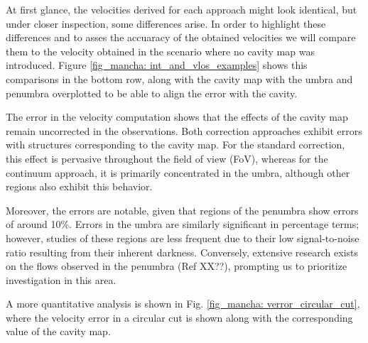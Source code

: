 At first glance, the velocities derived for each approach might look identical, but under closer inspection, some differences arise. In order to highlight these differences and to asses the accuaracy of the obtained velocities we will compare them to the velocity obtained in the scenario where no cavity map was introduced. Figure \ref{fig_mancha: int_and_vlos_examples} shows this comparisons in the bottom row, along with the cavity map with the umbra and penumbra overplotted to be able to align the error with the cavity.   

The error in the velocity computation shows that the effects of the cavity map remain uncorrected in the observations. Both correction approaches exhibit errors with structures corresponding to the cavity map. For the standard correction, this effect is pervasive throughout the field of view (FoV), whereas for the continuum approach, it is primarily concentrated in the umbra, although other regions also exhibit this behavior.

Moreover, the errors are notable, given that regions of the penumbra show errors of around 10\%. Errors in the umbra are similarly significant in percentage terms; however, studies of these regions are less frequent due to their low signal-to-noise ratio resulting from their inherent darkness. Conversely, extensive research exists on the flows observed in the penumbra (Ref XX??), prompting us to prioritize investigation in this area.

A more quantitative analysis is shown in Fig. \ref{fig_mancha: verror_circular_cut}, where the velocity error in a circular cut is shown along with the corresponding value of the cavity map. 

